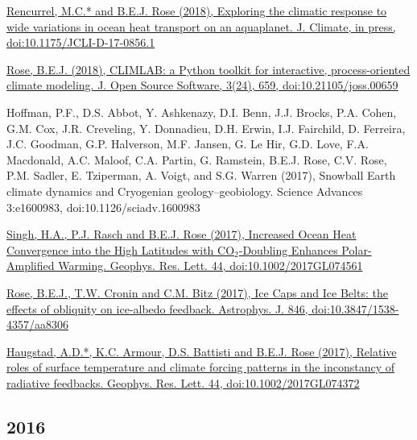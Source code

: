 \documentclass[11pt, letterpaper]{article} %
\newcommand{\years}[1]{\marginnote{\scriptsize #1}} %
\newcommand{\publink}{http://www.atmos.albany.edu/facstaff/brose/resources/Publications/}
\begin{document}

\years{2018} \href{\publink Rencurrel_Rose_jcli-d-17-0856.1.pdf}{Rencurrel, M.C.* and B.E.J. Rose (2018), Exploring the climatic response to wide variations in ocean heat transport on an aquaplanet. J. Climate, in press, doi:10.1175/JCLI-D-17-0856.1}

\href{\publink Rose_JOSS2018.pdf}{Rose, B.E.J. (2018), CLIMLAB: a Python toolkit for interactive, process-oriented climate modeling. J. Open Source Software, 3(24), 659, doi:10.21105/joss.00659}


\vspace{0.2 cm}

\years{2017} Hoffman, P.F., D.S. Abbot, Y. Ashkenazy, D.I. Benn, J.J. Brocks, P.A. Cohen, G.M.
  Cox, J.R. Creveling, Y. Donnadieu, D.H. Erwin, I.J. Fairchild, D.
  Ferreira, J.C. Goodman, G.P. Halverson, M.F. Jansen, G. Le Hir, G.D.
  Love, F.A. Macdonald, A.C. Maloof, C.A. Partin, G. Ramstein, B.E.J.
  Rose, C.V. Rose, P.M. Sadler, E. Tziperman, A. Voigt, and S.G. Warren (2017),
  Snowball Earth climate dynamics and Cryogenian geology--geobiology.
  Science Advances 3:e1600983, doi:10.1126/sciadv.1600983

\href{\publink Singh_et_al-2017-Geophysical_Research_Letters-2.pdf}{Singh, H.A., P.J. Rasch and B.E.J. Rose (2017), Increased Ocean Heat Convergence into the High Latitudes with CO$_2$-Doubling Enhances Polar-Amplified Warming. Geophys. Res. Lett. 44, doi:10.1002/2017GL074561}

\href{\publink Rose_Cronin_Bitz_ApJ_accepted.pdf}{Rose, B.E.J., T.W. Cronin and C.M. Bitz (2017), Ice Caps and Ice Belts: the effects of obliquity on ice-albedo feedback. Astrophys. J. 846, doi:10.3847/1538-4357/aa8306}

\href{\publink Haugstad_et_al-2017-Geophysical_Research_Letters.pdf}{Haugstad, A.D.*, K.C. Armour, D.S. Battisti and B.E.J. Rose (2017), Relative roles of surface temperature and climate forcing patterns in the inconstancy of radiative feedbacks. Geophys. Res. Lett. 44, doi:10.1002/2017GL074372}

\subsection*{2016} 
\end{document}
